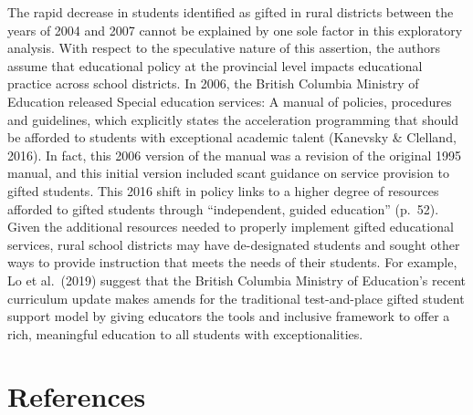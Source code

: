 \documentclass[
  english,
  man,floatsintext]{apa6}
\begin{document}
The rapid decrease in students identified as gifted in rural districts between the years of 2004 and 2007 cannot be explained by one sole factor in this exploratory analysis. With respect to the speculative nature of this assertion, the authors assume that educational policy at the provincial level impacts educational practice across school districts. In 2006, the British Columbia Ministry of Education released Special education services: A manual of policies, procedures and guidelines, which explicitly states the acceleration programming that should be afforded to students with exceptional academic talent (Kanevsky \& Clelland, 2016). In fact, this 2006 version of the manual was a revision of the original 1995 manual, and this initial version included scant guidance on service provision to gifted students. This 2016 shift in policy links to a higher degree of resources afforded to gifted students through \enquote{independent, guided education} (p.~52). Given the additional resources needed to properly implement gifted educational services, rural school districts may have de-designated students and sought other ways to provide instruction that meets the needs of their students. For example, Lo et al.~(2019) suggest that the British Columbia Ministry of Education's recent curriculum update makes amends for the traditional test-and-place gifted student support model by giving educators the tools and inclusive framework to offer a rich, meaningful education to all students with exceptionalities.

\newpage

\hypertarget{references}{%
\section{References}\label{references}}

\begingroup
\setlength{\parindent}{-0.5in}
\setlength{\leftskip}{0.5in}

\hypertarget{refs}{}

\endgroup


\clearpage
\renewcommand{\listfigurename}{Figure captions}

\clearpage
\renewcommand{\listtablename}{Table captions}
\end{document}
